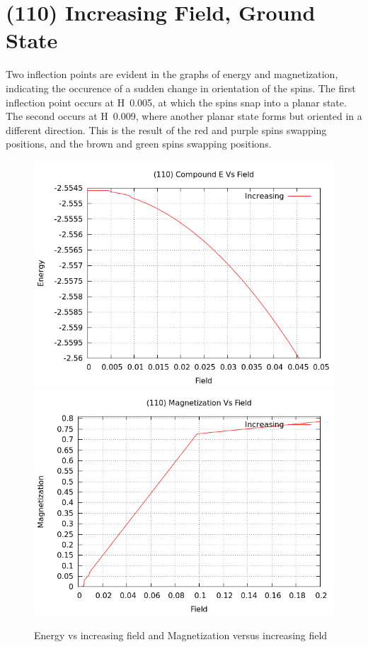\documentclass{article}
\begin{document}
\section{(110) Increasing Field, Ground State}
Two inflection points are evident in the graphs of energy and magnetization, indicating the occurence of a sudden
change in orientation of the spins. The first inflection point occurs at H~0.005, at which the spins snap into a 
planar state. The second occurs at H~0.009, where another planar state forms but oriented in a different direction. This 
is the result of the red and purple spins swapping positions, and the brown and green spins swapping positions. 
\begin{figure}[ht]
 \centering 
\includegraphics[scale=0.3]{HVariedData/Increasing/110EInc.png}
\includegraphics[scale=0.3]{HVariedData/Increasing/110Minc.png}
\caption{Energy vs increasing field and Magnetization versus increasing field}
\end{figure}
\end{document}
